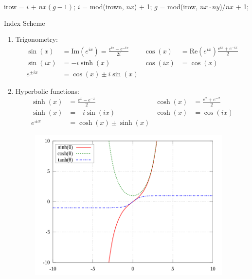 \documentclass{school-22.211-notes}
\begin{document}
\begin{algorithm}
  \begin{algorithmic}
    \STATE irow = $i$ + $nx(g-1)$;
    $i$ = mod(irown, $nx$) + 1;
    $g$ = mod(irow, $nx \cdot ny$)/$nx$ + 1;
    \ENDFOR
  \end{algorithmic}
  \caption{Index Scheme}
\end{algorithm}


\clearpage
{}
\begin{enumerate}
\item Trigonometry:
 \begin{align}
  \sin(x) &= \mathrm{Im}(e^{ix}) = \frac{e^{ix} - e^{-ix}}{2i} & \cos(x) &= \mathrm{Re}(e^{ix})\frac{e^{ix} + e^{-ix}}{2} \\
  \sin(ix) &= -i \sinh(x) & \cos(ix) &= \cos (x) \\
  e^{\pm ix} &= \cos(x) \pm i\sin(x) 
\end{align}


\item Hyperbolic functions:
\begin{align}
  \sinh(x) &= \frac{e^x - e^{-x}}{2} & \cosh(x) &= \frac{e^x + e^{-x}}{2} \\
  \sinh(x) &= -i \sin(ix) & \cosh(x) &= \cos (ix)  \\
  e^{\pm x} &= \cosh(x) \pm \sinh(x)
\end{align}

\begin{figure}[ht]
  \centering
  \includegraphics[width=4in]{images/dfs/sinh-cosh.png}
\end{figure}

\end{enumerate}
\end{document}
